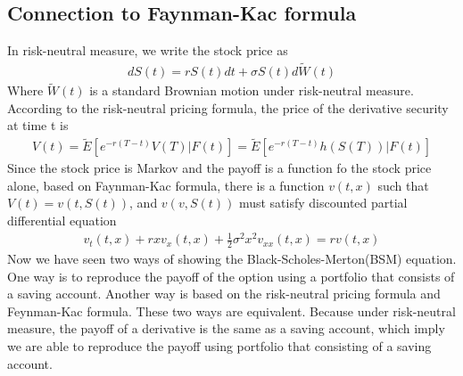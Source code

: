 \documentclass[a4paper]{article}
\begin{document}
\subsection{Connection to Faynman-Kac formula}
In risk-neutral measure, we write the stock price as
\begin{align*}
	dS(t) = rS(t) dt + \sigma S(t) d \tilde W(t) 
\end{align*}
Where $\tilde W(t)$ is a standard Brownian motion under risk-neutral measure.\\
According to the risk-neutral pricing formula, the price of the derivative security at time t is
\begin{align}
	V(t) = \tilde E[e^{-r(T-t)}V(T)| F(t)] = \tilde E[e^{-r(T-t)}h(S(T))| F(t)] \label{rn}
\end{align}
Since the stock price is Markov and the payoff is a function fo the stock price alone, based on Faynman-Kac formula, there is a function $v(t,x)$ such that $V(t) = v(t, S(t))$, and $v(v, S(t))$ must satisfy discounted partial differential equation 
\begin{align*}
	v_t(t,x) + rx v_x(t,x) + \frac{1}{2} \sigma^2 x^2 v_{xx}(t,x) = rv(t,x)
\end{align*}
Now we have seen two ways of showing the Black-Scholes-Merton(BSM) equation. 
One way is to reproduce the payoff of the option using a portfolio that consists of a 
saving account. Another way is based on the risk-neutral pricing formula and Feynman-Kac formula. 
These two ways are equivalent. Because under risk-neutral measure, the payoff of a derivative is the same as a saving account, which imply we are able to reproduce the payoff using portfolio that consisting of a saving account.
\end{document}
